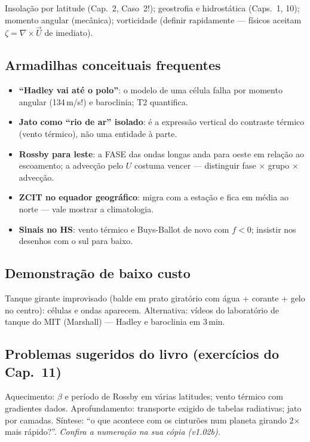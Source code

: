 Insolação por latitude (Cap.~2, Caso~2!); geostrofia e hidrostática
(Caps.~1, 10); momento angular (mecânica); vorticidade (definir
rapidamente — físicos aceitam $\zeta = \nabla\times\vec U$ de imediato).

\subsection*{Armadilhas conceituais frequentes}

\begin{itemize}
  \item \textbf{``Hadley vai até o polo''}: o modelo de uma célula falha
        por momento angular (134\,m/s!) e baroclinia; T2 quantifica.
  \item \textbf{Jato como ``rio de ar'' isolado}: é a expressão vertical do
        contraste térmico (vento térmico), não uma entidade à parte.
  \item \textbf{Rossby para leste}: a FASE das ondas longas anda para
        oeste em relação ao escoamento; a advecção pelo $U$ costuma vencer
        — distinguir fase × grupo × advecção.
  \item \textbf{ZCIT no equador geográfico}: migra com a estação e fica em
        média ao norte — vale mostrar a climatologia.
  \item \textbf{Sinais no HS}: vento térmico e Buys-Ballot de novo com
        $f<0$; insistir nos desenhos com o sul para baixo.
\end{itemize}

\subsection*{Demonstração de baixo custo}

Tanque girante improvisado (balde em prato giratório com água + corante +
gelo no centro): células e ondas aparecem. Alternativa: vídeos do
laboratório de tanque do MIT (Marshall) — Hadley e baroclinia em 3\,min.

\subsection*{Problemas sugeridos do livro (exercícios do Cap.~11)}

Aquecimento: $\beta$ e período de Rossby em várias latitudes; vento térmico
com gradientes dados. Aprofundamento: transporte exigido de tabelas
radiativas; jato por camadas. Síntese: ``o que acontece com os cinturões
num planeta girando 2$\times$ mais rápido?''.
\emph{Confira a numeração na sua cópia (v1.02b).}

